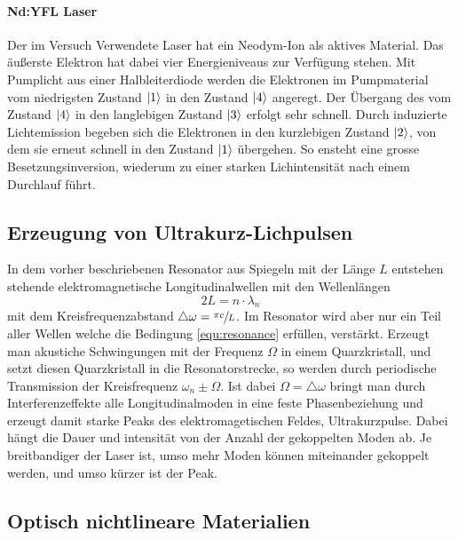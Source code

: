 \paragraph{Nd:YFL Laser}
Der im Versuch Verwendete Laser hat ein Neodym-Ion als aktives Material.
Das äußerste Elektron hat dabei vier Energieniveaus zur Verfügung stehen.
Mit Pumplicht aus einer Halbleiterdiode werden die Elektronen im Pumpmaterial
vom niedrigsten Zustand $\ket{1}$ in den Zustand $\ket{4}$ angeregt. Der Übergang des
vom Zustand $\ket{4}$ in den langlebigen Zustand $\ket{3}$ erfolgt sehr
schnell. Durch induzierte Lichtemission begeben sich die Elektronen in den kurzlebigen
Zustand $\ket{2}$, von dem sie erneut schnell in den Zustand $\ket{1}$ übergehen.
So ensteht eine grosse Besetzungsinversion, wiederum zu einer starken Lichintensität
nach einem Durchlauf führt.

\subsection{Erzeugung von Ultrakurz-Lichpulsen}
In dem vorher beschriebenen Resonator aus Spiegeln mit der Länge $L$
entstehen stehende elektromagnetische Longitudinalwellen mit den Wellenlängen
\begin{equation}
  2L = n \cdot \lambda_n
  \label{equ:resonance}
\end{equation}
mit dem Kreisfrequenzabstand $\triangle \omega = \sfrac{\pi c}{L}$. 
Im Resonator wird aber nur ein Teil aller Wellen welche die Bedingung \ref{equ:resonance}
erfüllen, verstärkt. 
Erzeugt man akustiche Schwingungen mit der Frequenz $\Omega$ in einem Quarzkristall, 
und setzt diesen Quarzkristall in die Resonatorstrecke, so werden durch periodische Transmission
der Kreisfrequenz $\omega_n \pm \Omega$. Ist dabei $\Omega = \triangle \omega$
bringt man durch Interferenzeffekte alle Longitudinalmoden in eine feste Phasenbeziehung
und erzeugt damit starke Peaks des elektromagetischen Feldes, Ultrakurzpulse.
Dabei hängt die Dauer und intensität von der Anzahl der gekoppelten Moden ab.
Je breitbandiger der Laser ist, umso mehr Moden können miteinander gekoppelt werden,
und umso kürzer ist der Peak.

\subsection{Optisch nichtlineare Materialien}
